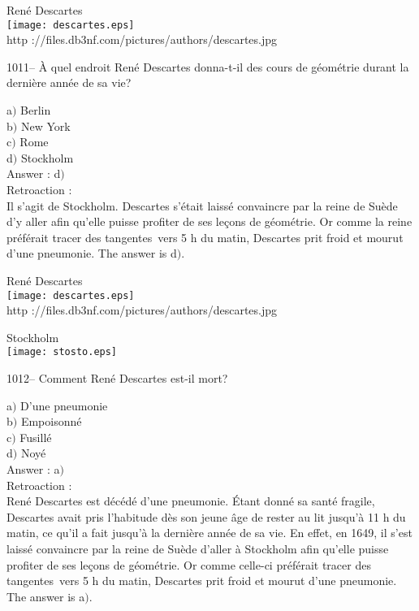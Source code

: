 ﻿\documentclass[letterpaper, 12pt]{article}
\begin{document}
        \begin{center}
        Ren\'e Descartes\\
    \texttt{[image: descartes.eps]}\\
        {\footnotesize http
://files.db3nf.com/pictures/authors/descartes.jpg}
    \end{center}

1011-- \`A quel endroit Ren\'e Descartes donna-t-il des cours de
g\'eom\'etrie durant la derni\`ere ann\'ee de sa vie?

a$)$ Berlin \\
b$)$ New York \\
c$)$ Rome \\
d$)$ Stockholm\\

Answer : d$)$\\

Retroaction :\\
Il s'agit de Stockholm. Descartes s'\'etait laiss\'e convaincre par
la reine de Su\`ede d'y aller afin qu'elle puisse profiter de ses
le\c cons de g\'eom\'etrie.  Or comme la reine pr\'ef\'erait \og
tracer des tangentes\fg\ vers 5 h du matin, Descartes prit froid et
mourut d'une pneumonie.
The answer is d$)$.\\

        \begin{center}
        Ren\'e Descartes\\
    \texttt{[image: descartes.eps]}\\
        {\footnotesize http
://files.db3nf.com/pictures/authors/descartes.jpg}
    \end{center}

        \begin{center}
        Stockholm\\
    \texttt{[image: stosto.eps]}\\
    \end{center}

1012-- Comment Ren\'e Descartes est-il mort?

a$)$ D'une pneumonie \\
b$)$ Empoisonn\'e \\
c$)$ Fusill\'e \\
d$)$ Noy\'e\\

Answer : a$)$\\

Retroaction :\\
Ren\'e Descartes est d\'ec\'ed\'e d'une pneumonie. \'Etant donn\'e
sa sant\'e fragile, Descartes avait pris l'habitude d\`es son jeune
\^age de rester au lit jusqu'\`a 11 h du matin, ce qu'il a fait
jusqu'\`a la derni\`ere ann\'ee de sa vie.  En effet, en 1649, il
s'est laiss\'e convaincre par la reine de Su\`ede d'aller \`a
Stockholm afin qu'elle puisse profiter de ses le\c cons de
g\'eom\'etrie.  Or comme celle-ci pr\'ef\'erait \og tracer des
tangentes\fg\ vers 5 h du matin, Descartes prit froid et mourut
d'une pneumonie.
The answer is a$)$.\\
\end{document}
